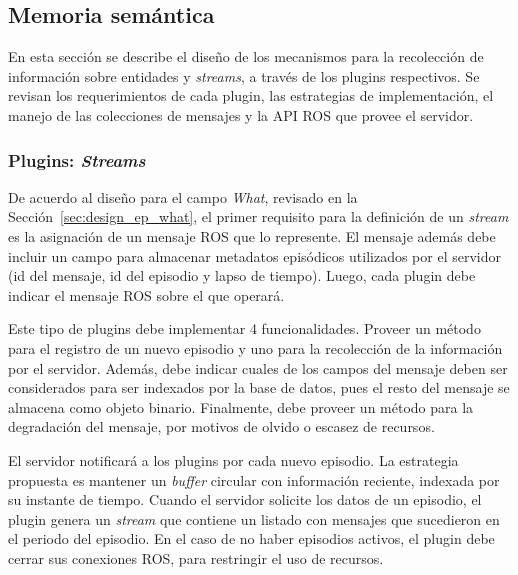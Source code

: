 \subsection{Memoria semántica}\label{sec:design_server_semantic_plugins}

En esta sección se describe el diseño de los mecanismos para la recolección de información sobre entidades y \textit{streams}, a través de los plugins respectivos. Se revisan los requerimientos de cada plugin, las estrategias de implementación, el manejo de las colecciones de mensajes y la API ROS que provee el servidor.


\subsubsection{Plugins: \textit{Streams}}

De acuerdo al diseño para el campo \textit{What}, revisado en la Sección~\ref{sec:design_ep_what}, el primer requisito para la definición de un \textit{stream} es la asignación de un mensaje ROS que lo represente. El mensaje además debe incluir un campo para almacenar metadatos episódicos utilizados por el servidor (id del mensaje, id del episodio y lapso de tiempo). Luego, cada plugin debe indicar el mensaje ROS sobre el que operará.

Este tipo de plugins debe implementar 4 funcionalidades. Proveer un método para el registro de un nuevo episodio y uno para la recolección de la información por el servidor. Además, debe indicar cuales de los campos del mensaje deben ser considerados para ser indexados por la base de datos, pues el resto del mensaje se almacena como objeto binario. Finalmente, debe proveer un método para la degradación del mensaje, por motivos de olvido o escasez de recursos.

El servidor notificará a los plugins por cada nuevo episodio. La estrategia propuesta es mantener un \textit{buffer} circular con información reciente, indexada por su instante de tiempo. Cuando el servidor solicite los datos de un episodio, el plugin genera un \textit{stream} que contiene un listado con mensajes que sucedieron en el periodo del episodio. En el caso de no haber episodios activos, el plugin debe cerrar sus conexiones ROS, para restringir el uso de recursos.

